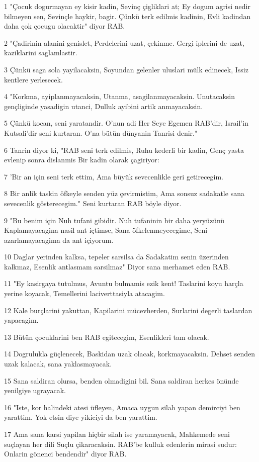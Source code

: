 \par 1 "Çocuk dogurmayan ey kisir kadin, Sevinç çigliklari at; Ey dogum agrisi nedir bilmeyen sen, Sevinçle haykir, bagir. Çünkü terk edilmis kadinin, Evli kadindan daha çok çocugu olacaktir" diyor RAB.
\par 2 "Çadirinin alanini genislet, Perdelerini uzat, çekinme. Gergi iplerini de uzat, kaziklarini saglamlastir.
\par 3 Çünkü saga sola yayilacaksin, Soyundan gelenler uluslari mülk edinecek, Issiz kentlere yerlesecek.
\par 4 "Korkma, ayiplanmayacaksin, Utanma, asagilanmayacaksin. Unutacaksin gençliginde yasadigin utanci, Dulluk ayibini artik anmayacaksin.
\par 5 Çünkü kocan, seni yaratandir. O'nun adi Her Seye Egemen RAB'dir, Israil'in Kutsali'dir seni kurtaran. O'na bütün dünyanin Tanrisi denir."
\par 6 Tanrin diyor ki, "RAB seni terk edilmis, Ruhu kederli bir kadin, Genç yasta evlenip sonra dislanmis Bir kadin olarak çagiriyor:
\par 7 'Bir an için seni terk ettim, Ama büyük sevecenlikle geri getirecegim.
\par 8 Bir anlik taskin öfkeyle senden yüz çevirmistim, Ama sonsuz sadakatle sana sevecenlik gösterecegim." Seni kurtaran RAB böyle diyor.
\par 9 "Bu benim için Nuh tufani gibidir. Nuh tufaninin bir daha yeryüzünü Kaplamayacagina nasil ant içtimse, Sana öfkelenmeyecegime, Seni azarlamayacagima da ant içiyorum.
\par 10 Daglar yerinden kalksa, tepeler sarsilsa da Sadakatim senin üzerinden kalkmaz, Esenlik antlasmam sarsilmaz" Diyor sana merhamet eden RAB.
\par 11 "Ey kasirgaya tutulmus, Avuntu bulmamis ezik kent! Taslarini koyu harçla yerine koyacak, Temellerini laciverttasiyla atacagim.
\par 12 Kale burçlarini yakuttan, Kapilarini mücevherden, Surlarini degerli taslardan yapacagim.
\par 13 Bütün çocuklarini ben RAB egitecegim, Esenlikleri tam olacak.
\par 14 Dogrulukla güçlenecek, Baskidan uzak olacak, korkmayacaksin. Dehset senden uzak kalacak, sana yaklasmayacak.
\par 15 Sana saldiran olursa, benden olmadigini bil. Sana saldiran herkes önünde yenilgiye ugrayacak.
\par 16 "Iste, kor halindeki atesi üfleyen, Amaca uygun silah yapan demirciyi ben yarattim. Yok etsin diye yikiciyi da ben yarattim.
\par 17 Ama sana karsi yapilan hiçbir silah ise yaramayacak, Mahkemede seni suçlayan her dili Suçlu çikaracaksin. RAB'be kulluk edenlerin mirasi sudur: Onlarin gönenci bendendir" diyor RAB.

